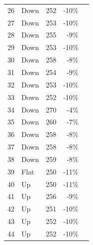 \documentclass{scrartcl}
\begin{document}
\begin{longtable}{|r|l|r|r|r|}
    26    & Down  & 252   & \cellcolor[rgb]{ 1,  .922,  .612}\textcolor[rgb]{ .612,  .341,  0}{-10\%} &  \\
    27    & Down  & 253   & \cellcolor[rgb]{ 1,  .922,  .612}\textcolor[rgb]{ .612,  .341,  0}{-10\%} &  \\
    28    & Down  & 255   & \cellcolor[rgb]{ 1,  .922,  .612}\textcolor[rgb]{ .612,  .341,  0}{-9\%} &  \\
    29    & Down  & 253   & \cellcolor[rgb]{ 1,  .922,  .612}\textcolor[rgb]{ .612,  .341,  0}{-10\%} &  \\
    30    & Down  & 258   & \cellcolor[rgb]{ 1,  .922,  .612}\textcolor[rgb]{ .612,  .341,  0}{-8\%} &  \\
    31    & Down  & 254   & \cellcolor[rgb]{ 1,  .922,  .612}\textcolor[rgb]{ .612,  .341,  0}{-9\%} &  \\
    32    & Down  & 253   & \cellcolor[rgb]{ 1,  .922,  .612}\textcolor[rgb]{ .612,  .341,  0}{-10\%} &  \\
    33    & Down  & 252   & \cellcolor[rgb]{ 1,  .922,  .612}\textcolor[rgb]{ .612,  .341,  0}{-10\%} &  \\
    34    & Down  & 270   & -4\%  &  \\
    35    & Down  & 260   & \cellcolor[rgb]{ 1,  .922,  .612}\textcolor[rgb]{ .612,  .341,  0}{-7\%} &  \\
    36    & Down  & 258   & \cellcolor[rgb]{ 1,  .922,  .612}\textcolor[rgb]{ .612,  .341,  0}{-8\%} &  \\
    37    & Down  & 258   & \cellcolor[rgb]{ 1,  .922,  .612}\textcolor[rgb]{ .612,  .341,  0}{-8\%} &  \\
    38    & Down  & 259   & \cellcolor[rgb]{ 1,  .922,  .612}\textcolor[rgb]{ .612,  .341,  0}{-8\%} &  \\
    39    & Flat  & 250   & \cellcolor[rgb]{ 1,  .78,  .808}\textcolor[rgb]{ .612,  0,  .024}{-11\%} &  \\
    40    & Up    & 250   & \cellcolor[rgb]{ 1,  .78,  .808}\textcolor[rgb]{ .612,  0,  .024}{-11\%} &  \\
    41    & Up    & 256   & \cellcolor[rgb]{ 1,  .922,  .612}\textcolor[rgb]{ .612,  .341,  0}{-9\%} &  \\
    42    & Up    & 251   & \cellcolor[rgb]{ 1,  .922,  .612}\textcolor[rgb]{ .612,  .341,  0}{-10\%} &  \\
    43    & Up    & 252   & \cellcolor[rgb]{ 1,  .922,  .612}\textcolor[rgb]{ .612,  .341,  0}{-10\%} &  \\
    44    & Up    & 252   & \cellcolor[rgb]{ 1,  .922,  .612}\textcolor[rgb]{ .612,  .341,  0}{-10\%} &  \\

\end{longtable}
\end{document}
